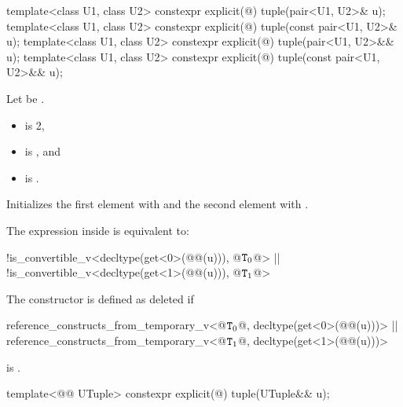 %
\begin{itemdecl}
template<class U1, class U2> constexpr explicit(@\seebelow@) tuple(pair<U1, U2>& u);
template<class U1, class U2> constexpr explicit(@\seebelow@) tuple(const pair<U1, U2>& u);
template<class U1, class U2> constexpr explicit(@\seebelow@) tuple(pair<U1, U2>&& u);
template<class U1, class U2> constexpr explicit(@\seebelow@) tuple(const pair<U1, U2>&& u);
\end{itemdecl}

\begin{itemdescr}
\pnum
Let  be .

\pnum
\constraints
\begin{itemize}
\item
{} is 2,
\item
{} is , and
\item
{} is .
\end{itemize}

\pnum
\effects
Initializes the first element with  and
the second element with .

\pnum
\remarks
The expression inside  is equivalent to:
\begin{codeblock}
!is_convertible_v<decltype(get<0>(@@(u))), @$\texttt{\protect T}_0$@> ||
!is_convertible_v<decltype(get<1>(@@(u))), @$\texttt{\protect T}_1$@>
\end{codeblock}
The constructor is defined as deleted if
\begin{codeblock}
reference_constructs_from_temporary_v<@$\texttt{\protect T}_0$@, decltype(get<0>(@@(u)))> ||
reference_constructs_from_temporary_v<@$\texttt{\protect T}_1$@, decltype(get<1>(@@(u)))>
\end{codeblock}
is .
\end{itemdescr}

%
\begin{itemdecl}
template<@@ UTuple>
  constexpr explicit(@\seebelow@) tuple(UTuple&& u);
\end{itemdecl}

